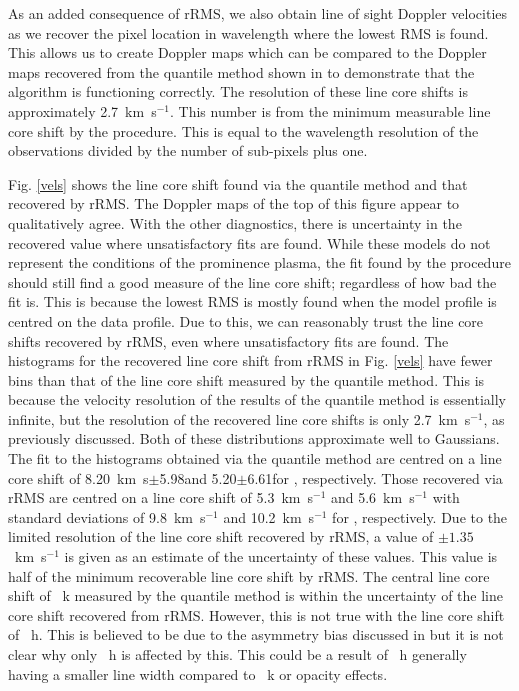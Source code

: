 As an added consequence of rRMS, we also obtain line of sight Doppler velocities as we recover the pixel location in wavelength where the lowest RMS is found. This allows us to create Doppler maps which can be compared to the Doppler maps recovered from the quantile method shown in  to demonstrate that the algorithm is functioning correctly. The resolution of these line core shifts is approximately 2.7~km~s$^{-1}$. This number is from the minimum measurable line core shift by the procedure. This is equal to the wavelength resolution of the observations divided by the number of sub-pixels plus one. 

Fig. \ref{vels} shows the line core shift found via the quantile method and that recovered by rRMS. The Doppler maps of the top of this figure appear to qualitatively agree. With the other diagnostics, there is uncertainty in the recovered value where unsatisfactory fits are found. While these models do not represent the conditions of the prominence plasma, the fit found by the procedure should still find a good measure of the line core shift; regardless of how bad the fit is. This is because the lowest RMS is mostly found when the model profile is centred on the data profile. Due to this, we can reasonably trust the line core shifts recovered by rRMS, even where unsatisfactory fits are found.
The histograms for the recovered line core shift from rRMS in Fig. \ref{vels} have fewer bins than that of the line core shift measured by the quantile method. This is because the velocity resolution of the results of the quantile method is essentially infinite, but the resolution of the recovered line core shifts is only 2.7~km~s$^{-1}$, as previously discussed. Both of these distributions approximate well to Gaussians. The fit to the histograms obtained via the quantile method are centred on a line core shift of 8.20~km~s$\pm$5.98\kms and 5.20$\pm$6.61\kms for \mghk, respectively. Those recovered via rRMS are centred on a line core shift of 5.3~km~s$^{-1}$ and 5.6~km~s$^{-1}$ with standard deviations of 9.8~km~s$^{-1}$ and 10.2~km~s$^{-1}$ for \mghk, respectively. Due to the limited resolution of the line core shift recovered by rRMS, a value of $\pm1.35$~km~s$^{-1}$ is given as an estimate of the uncertainty of these values. This value is half of the minimum recoverable line core shift by rRMS. The central line core shift of \mgii~k measured by the quantile method is within the uncertainty of the line core shift recovered from rRMS. However, this is not true with the line core shift of \mgii~h. This is believed to be due to the asymmetry bias discussed in  but it is not clear why only \mgii~h is affected by this. This could be a result of \mgii~h generally having a smaller line width compared to \mgii~k or opacity effects.

